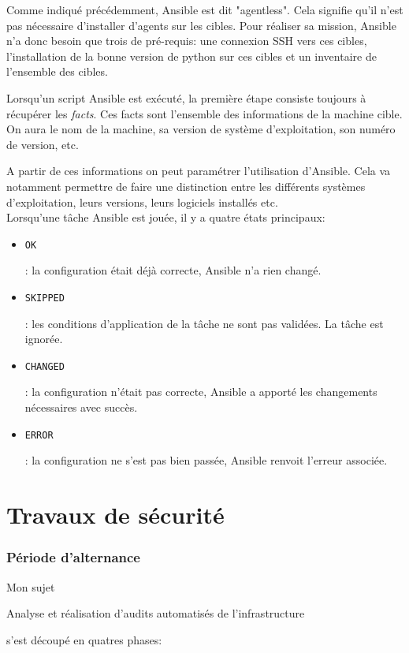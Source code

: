 \documentclass[12pt, a4paper, twoside]{article}
\begin{document}
Comme indiqué précédemment, \gls{Ansible} est dit "agentless". 
Cela signifie qu'il n'est pas nécessaire d'installer d'agents sur les cibles. 
Pour réaliser sa mission, \gls{Ansible} n'a donc besoin que trois de pré-requis:  une connexion SSH vers ces cibles, l'installation de la bonne version de python sur ces cibles et un inventaire de l'ensemble des cibles. 

Lorsqu'un script \gls{Ansible} est exécuté, la première étape consiste toujours à récupérer les \textit{facts}. 
Ces facts sont l'ensemble des informations de la machine cible. 
On aura le nom de la machine, sa version de système d'exploitation, son numéro de version, etc. 

A partir de ces informations on peut paramétrer l'utilisation d'\gls{Ansible}. 
Cela va notamment permettre de faire une distinction entre les différents systèmes d'exploitation, leurs versions, leurs logiciels installés etc.  \\

Lorsqu'une tâche \gls{Ansible} est jouée, il y a quatre états principaux:
\begin{itemize}
    \item \begin{code}\texttt{OK}\end{code}: la configuration était déjà correcte, \gls{Ansible} n'a rien changé.
    \item \begin{code}\texttt{SKIPPED}\end{code}: les conditions d'application de la tâche ne sont pas validées. La tâche est ignorée.
    \item \begin{code}\texttt{CHANGED}\end{code}: la configuration n'était pas correcte, \gls{Ansible} a apporté les changements nécessaires avec succès.
    \item \begin{code}\texttt{ERROR}\end{code}: la configuration ne s'est pas bien passée, \gls{Ansible} renvoit l'erreur associée.
\end{itemize}

\newpage
\part{Travaux de sécurité}
\section{Période d'alternance}
Mon sujet \begin{hilite} Analyse et réalisation d'audits automatisés de l'infrastructure \end{hilite} s'est découpé en quatres phases:
\end{document}
